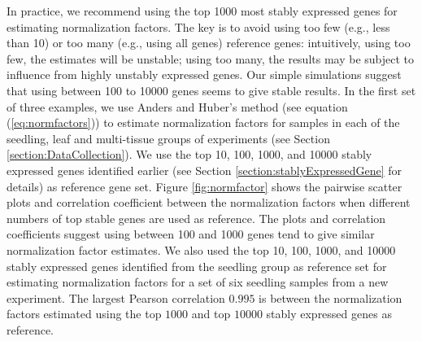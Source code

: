 \documentclass[letterpaper,12pt]{article}
\begin{document}
%

In practice, we recommend using the top 1000 most stably expressed genes for estimating
normalization factors. The key is to avoid using too few (e.g., less than 10)
or too many (e.g., using all genes) reference genes: intuitively, using too few, the estimates
will be unstable;
using too many, the results may be subject to influence from highly unstably
expressed genes.  Our simple simulations suggest that using between 100 to
10000 genes seems to give stable results.  In the first set of three
examples, we use Anders and Huber's method (see equation
(\ref{eq:normfactors})) to estimate normalization factors for samples in each
of the seedling, leaf and multi-tissue groups of experiments (see Section \ref{section:DataCollection}).  We
use the top 10, 100, 1000, and 10000 stably expressed genes identified earlier
(see Section \ref{section:stablyExpressedGene} for details) as reference gene set. Figure \ref{fig:normfactor} shows
the pairwise scatter plots and correlation coefficient between the
normalization factors when different numbers of top stable genes are used as
reference. The plots and correlation coefficients suggest using between 100
and 1000 genes tend to give similar normalization factor estimates. We also
used the top 10, 100, 1000, and 10000 stably expressed genes identified from
the seedling group as reference set for estimating normalization factors for a
set of six seedling samples from a new experiment. The largest Pearson
correlation $0.995$ is between the normalization factors estimated using the
top $1000$ and top $10000$ stably expressed genes as reference.

\end{document}
